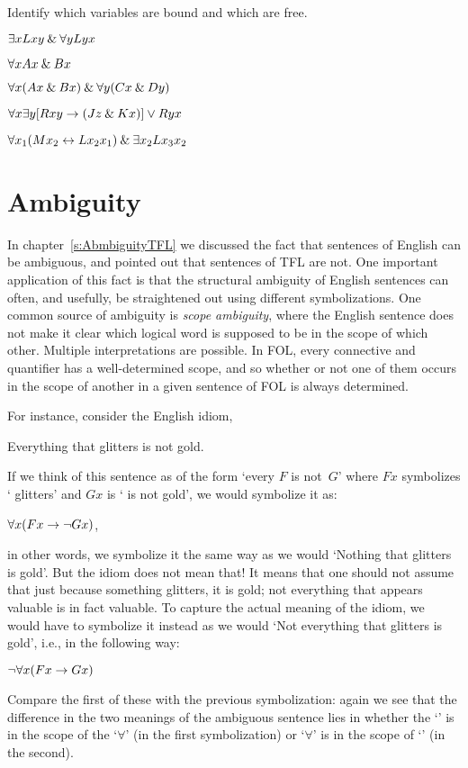 \begin{practiceproblems}
\problempart
\label{pr.freeFOL}
Identify which variables are bound and which are free.
\begin{earg}
\item $\exists x Lxy \mathbin{\&} \forall y Lyx$
\item $\forall x Ax \mathbin{\&} Bx$
\item $\forall x (Ax \mathbin{\&} Bx) \mathbin{\&} \forall y(Cx \mathbin{\&} Dy)$
\item $\forall x\exists y[Rxy \rightarrow (Jz \mathbin{\&} Kx)] \vee Ryx$
\item $\forall x_1(Mx_2 \leftrightarrow Lx_2x_1) \mathbin{\&} \exists x_2 Lx_3x_2$
\end{earg}


\end{practiceproblems}

\chapter{Ambiguity}

In chapter~\ref{s:AbmbiguityTFL} we discussed the fact that sentences of English can be ambiguous, and pointed out that sentences of TFL are not. One important application of this fact is that the structural ambiguity of English sentences can often, and usefully, be straightened out using different symbolizations.  One common source of ambiguity is \emph{scope ambiguity}, where the English sentence does not make it clear which logical word is supposed to be in the scope of which other. Multiple interpretations are possible.  In FOL, every connective and quantifier has a well-determined scope, and so whether or not one of them occurs in the scope of another in a given sentence of FOL is always determined.

For instance, consider the English idiom,
\begin{earg}
	\item[\ex{glitters}]
	Everything that glitters is not gold.
\end{earg}
If we think of this sentence as of the form `every $F$ is not~$G$' where $F{x}$ symbolizes ` glitters' and ${G}{x}$ is ` is not gold', we would symbolize it as:
\begin{earg}
	\prem $\forall x(F{x} \rightarrow \neg {G}{x})$,
\end{earg}
in other words, we symbolize it the same way as we would `Nothing that glitters is gold'. But the idiom does not mean that! It means that one should not assume that just because something glitters, it is gold; not everything that appears valuable is in fact valuable.  To capture the actual meaning of the idiom, we would have to symbolize it instead as we would `Not everything that glitters is gold', i.e., in the following way:
\begin{earg}
	\prem $\neg\forall x(F{x} \rightarrow {G}{x})$
\end{earg}
Compare the first of these with the previous symbolization: again we see that the difference in the two meanings of the ambiguous sentence lies in whether the `\enot' is in the scope of the `$\forall$' (in the first symbolization) or `$\forall$' is in the scope of `\enot' (in the second).

